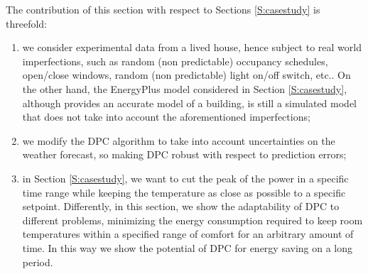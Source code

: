 \textcolor[rgb]{0,0,1}{The contribution of this section with respect to Sections \ref{S:casestudy} is threefold:
\begin{enumerate}
	\item we consider experimental data from a lived house, hence subject to real world imperfections, such as random (non predictable) occupancy schedules, open/close windows, random (non predictable) light on/off switch, etc..
	On the other hand, the EnergyPlus model considered in Section \ref{S:casestudy}, although provides an accurate model of a building, is still a simulated model that does not take into account the aforementioned imperfections;
	\item we modify the DPC algorithm to take into account uncertainties on the weather forecast, so making DPC robust with respect to prediction errors;
	\item in Section \ref{S:casestudy}, we want to cut the peak of the power in a specific time range while keeping the temperature as close as possible to a specific setpoint.
	Differently, in this section, we show the adaptability of DPC to different problems, minimizing the energy consumption required to keep room temperatures within a specified range of comfort for an arbitrary amount of time. In this way we show the potential of DPC for energy saving on a long period. 
\end{enumerate}}
